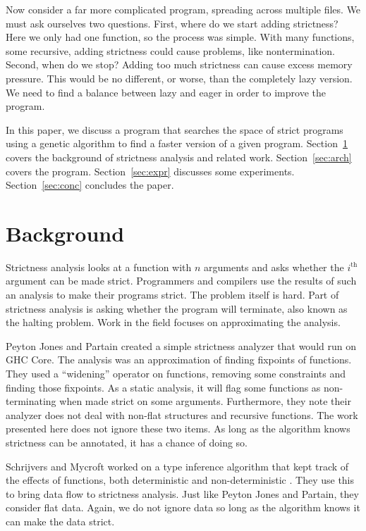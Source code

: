\documentclass{sigplanconf}
\begin{document}
Now consider a far more complicated program, spreading across multiple files. We must ask ourselves two questions. First, where do we start adding strictness? Here we only had one function, so the process was simple. With many functions, some recursive, adding strictness could cause problems, like nontermination. Second, when do we stop? Adding too much strictness can cause excess memory pressure. This would be no different, or worse, than the completely lazy version. We need to find a balance between lazy and eager in order to improve the program.

In this paper, we discuss a program that searches the space of strict programs using a genetic algorithm to find a faster version of a given program. Section~\ref{sec:back} covers the background of strictness analysis and related work. Section~\ref{sec:arch} covers the program. Section~\ref{sec:expr} discusses some experiments. Section~\ref{sec:conc} concludes the paper.

\section{Background}\label{sec:back}
Strictness analysis looks at a function with $n$ arguments and asks whether the $i^{\text{th}}$ argument can be made strict. Programmers and compilers use the results of such an analysis to make their programs strict. The problem itself is hard. Part of strictness analysis is asking whether the program will terminate, also known as the halting problem. Work in the field focuses on approximating the analysis.

Peyton Jones and Partain created a simple strictness analyzer that would run on GHC Core.\cite{pjones} The analysis was an approximation of finding fixpoints of functions. They used a ``widening'' operator on functions, removing some constraints and finding those fixpoints. As a static analysis, it will flag some functions as non-terminating when made strict on some arguments. Furthermore, they note their analyzer does not deal with non-flat structures and recursive functions. The work presented here does not ignore these two items. As long as the algorithm knows strictness can be annotated, it has a chance of doing so.

Schrijvers and Mycroft worked on a type inference algorithm that kept track of the effects of functions, both deterministic and non-deterministic \cite{mycroft, wadler}. They use this to bring data flow to strictness analysis. Just like Peyton Jones and Partain, they consider flat data. Again, we do not ignore data so long as the algorithm knows it can make the data strict.
\end{document}
